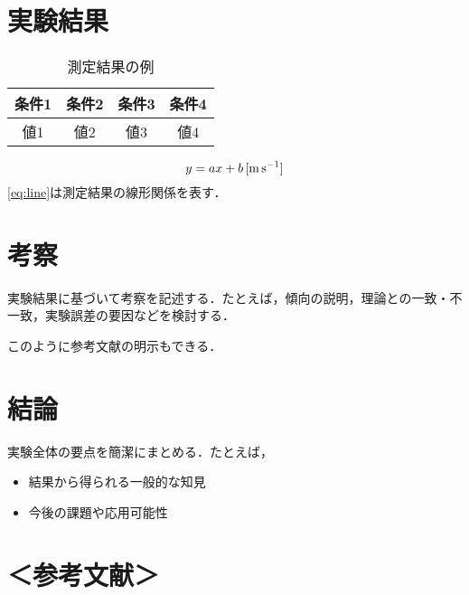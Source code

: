 \documentclass[lualatex,ja=standard]{bxjsarticle}
\begin{document}
\section{実験結果}
\begin{table}[htbp]
  \centering
  \caption{測定結果の例}
  \label{tab:example}
  \begin{tabular}{cccc}
    \toprule
    条件1 & 条件2 & 条件3 & 条件4 \\
    \midrule
    値1 & 値2 & 値3 & 値4 \\
    \bottomrule
  \end{tabular}
\end{table}

\begin{equation}
  y = a x + b \,\text{[\si{\meter\per\second}]}
  \label{eq:line}
\end{equation}
\autoref{eq:line}は測定結果の線形関係を表す．

\section{考察}
実験結果に基づいて考察を記述する．たとえば，傾向の説明，理論との一致・不一致，実験誤差の要因などを検討する．

このように参考文献の明示もできる\cite{nist811-si-guide}．

\section{結論}
実験全体の要点を簡潔にまとめる．たとえば，
\begin{itemize}
  \item 結果から得られる一般的な知見
  \item 今後の課題や応用可能性
\end{itemize}

\section*{＜参考文献＞}
\printbibliography[heading=none]
\end{document}
